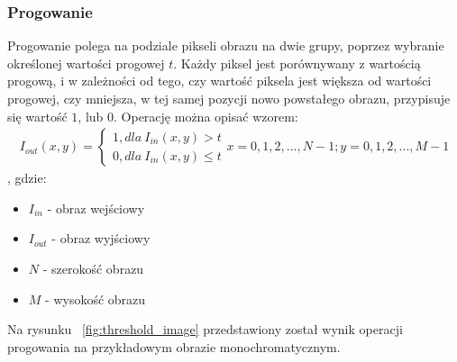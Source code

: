 \subsubsection{Progowanie} \label{sssec:threshold}
Progowanie polega na podziale pikseli obrazu na dwie grupy, poprzez wybranie określonej wartości progowej $t$. Każdy piksel jest porównywany z wartością progową, i w zależności od tego, czy wartość piksela jest większa od wartości progowej, czy mniejsza, w tej samej pozycji nowo powstałego obrazu, przypisuje się wartość $1$, lub $0$. Operację można opisać wzorem:
\begin{gather*}
  I_{out}(x, y) = \left\{\begin{matrix}
  1, dla \: I_{in}(x, y) > t\\
  0, dla \: I_{in}(x, y) \leq t
  \end{matrix}\right. x=0,1,2,...,N-1; y=0,1,2,...,M-1
\end{gather*},
gdzie:
\begin{itemize}
\item $I_{in}$ - obraz wejściowy
\item $I_{out}$ - obraz wyjściowy
\item $N$ - szerokość obrazu
\item $M$ - wysokość obrazu
\end{itemize}
Na rysunku ~\ref{fig:threshold_image} przedstawiony został wynik operacji progowania na przykładowym obrazie monochromatycznym.
